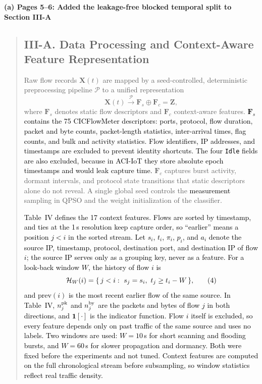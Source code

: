 \documentclass[11pt]{article}
\newenvironment{excerpt}{\begin{quote}\sloppy}{\end{quote}}
\newcommand{\mshead}[2]{\subsection*{\textbf{#1. #2}}}
\newcommand{\loc}[1]{\par\medskip\noindent\textbf{#1}\par}
\begin{document}
\loc{(a) Pages 5--6: Added the leakage-free blocked temporal split to Section III-A}
\begin{excerpt}
\mshead{III-A}{Data Processing and Context-Aware Feature Representation}


Raw flow records $\mathbf{X}(t)$ are mapped by a seed-controlled,
deterministic preprocessing pipeline $\mathcal{P}$ to a unified
representation
\begin{equation}
\mathbf{X}(t) \xrightarrow{\mathcal{P}}
\mathbf{F}_s \oplus \mathbf{F}_c = \mathbf{Z},
\tag{3}
\end{equation}
where $\mathbf{F}_s$ denotes static flow descriptors and
$\mathbf{F}_c$ context-aware features.
\textcolor{black}{$\mathbf{F}_s$ contains the 75 CICFlowMeter
descriptors: ports, protocol, flow duration, packet and byte counts,
packet-length statistics, inter-arrival times, flag counts, and bulk
and activity statistics. Flow identifiers, IP addresses, and
timestamps are excluded to prevent identity shortcuts. The four
\texttt{Idle} fields are also excluded, because in ACI-IoT they store
absolute epoch timestamps and would leak capture time.}
$\mathbf{F}_c$ captures burst activity, dormant intervals, and
protocol state transitions that static descriptors alone do not
reveal. A single global seed controls the
\textcolor{black}{measurement} sampling in QPSO and the
weight initialization of the classifier.

\textcolor{black}{Table~IV defines
the 17 context features. Flows are sorted by timestamp, and ties at
the 1\,s resolution keep capture order, so ``earlier'' means a
position $j<i$ in the sorted stream. Let $s_i$, $t_i$, $\pi_i$,
$p_i$, and $a_i$ denote the source IP, timestamp, protocol,
destination port, and destination IP of flow $i$; the source IP
serves only as a grouping key, never as a feature. For a look-back
window $W$, the history of flow $i$ is}
\begin{equation}
\textcolor{black}{\mathcal{H}_W(i)=\{\,j<i:\ s_j=s_i,\ t_j\ge t_i-W\,\},}
\tag{4}
\end{equation}
\textcolor{black}{and $\mathrm{prev}(i)$ is the most recent
earlier flow of the same source. In Table~IV,
$n^{\rm pk}_j$ and $n^{\rm by}_j$ are the packets and bytes of flow
$j$ in both directions, and $\mathbf{1}[\cdot]$ is the indicator
function. Flow $i$ itself is excluded, so
every feature depends only on past traffic of the same source and
uses no labels. Two windows are used: $W=10$\,s for short scanning
and flooding bursts, and $W=60$\,s for slower propagation and
dormancy. Both were fixed before the experiments and not tuned.
Context features are computed on the full chronological stream
before subsampling, so window statistics reflect real traffic
density.}


\end{excerpt}
\end{document}
